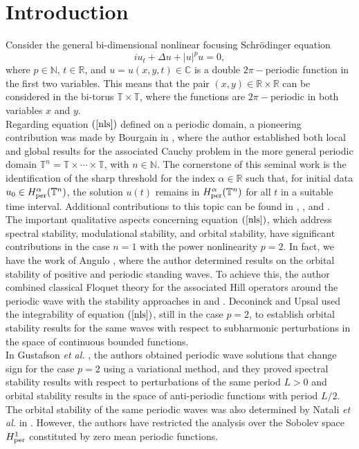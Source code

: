 \documentclass[12pt,reqno,a4paper]{amsart} %
\numberwithin{equation}{section}
\numberwithin{figure}{section}
\begin{document}
\section{Introduction} 
\indent Consider the general bi-dimensional nonlinear focusing Schr\"odinger equation 
\begin{equation}\label{nls}
	iu_t+\Delta u +|u|^pu=0,
	\end{equation}
	where $p\in\mathbb{N}$, $t\in\mathbb{R}$, and $u=u(x,y,t)\in\mathbb{C}$ is a double $2\pi-$periodic function in the first two variables. This means that the pair $(x,y)\in\mathbb{R}\times\mathbb{R}$ can be considered in the bi-torus $\mathbb{T}\times\mathbb{T}$, where the functions are $2\pi-$periodic in both variables $x$ and $y$.\\ 
	\indent Regarding equation $(\ref{nls})$ defined on a periodic domain, a pioneering contribution was made by Bourgain in \cite{bourgain1}, where the author established both local and global results for the associated Cauchy problem in the more general periodic domain $\mathbb{T}^n = \mathbb{T} \times \cdots \times \mathbb{T}$, with $n \in \mathbb{N}$. The cornerstone of this seminal work is the identification of the sharp threshold for the index $\alpha \in \mathbb{R}$ such that, for initial data $u_0 \in H_{\rm per}^{\alpha}(\mathbb{T}^n)$, the solution $u(t)$ remains in $H_{\rm per}^{\alpha}(\mathbb{T}^n)$ for all $t$ in a suitable time interval. Additional contributions to this topic can be found in \cite{Cazenave}, \cite{erdogan}, and \cite{ginibre}.\\
	\indent  The important qualitative aspects concerning equation $(\ref{nls})$, which address spectral stability, modulational stability, and orbital stability, have significant contributions in the case $n = 1$ with the power nonlinearity $p = 2$. In fact, we have the work of Angulo \cite{Angulo}, where the author determined results on the orbital stability of positive and periodic standing waves. To achieve this, the author combined classical Floquet theory for the associated Hill operators around the periodic wave with the stability approaches in \cite{GrillakisShatahStraussI} and \cite{WeinsteinNLS}. Deconinck and Upsal \cite{DeconinckUpsal} used the integrability of equation $(\ref{nls})$, still in the case $p = 2$, to establish orbital stability results for the same waves with respect to subharmonic perturbations in the space of continuous bounded functions.\\ 
	\indent In Gustafson \textit{et al.} \cite{GustafsonLecozTsai}, the authors obtained periodic wave solutions that change sign for the case $p = 2$ using a variational method, and they proved spectral stability results with respect to perturbations of the same period $L > 0$ and orbital stability results in the space of anti-periodic functions with period $L/2$. The orbital stability of the same periodic waves was also determined by Natali \textit{et al.} in \cite{NMLP2021}. However, the authors have restricted the analysis over the Sobolev space $H_{\rm per}^1$ constituted by zero mean periodic functions.\\
\end{document}
